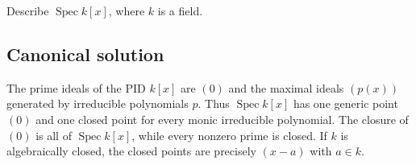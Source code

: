 
\begin{exercise}
	Describe \(\operatorname{Spec} k[x]\), where \(k\) is a field.
\end{exercise}

\subsection*{Canonical solution}
The prime ideals of the PID $k[x]$ are $(0)$ and the maximal ideals $(p(x))$ generated by irreducible polynomials $p$. Thus $\operatorname{Spec} k[x]$ has one generic point $(0)$ and one closed point for every monic irreducible polynomial. The closure of $(0)$ is all of $\operatorname{Spec} k[x]$, while every nonzero prime is closed. If $k$ is algebraically closed, the closed points are precisely $(x-a)$ with $a\in k$.
